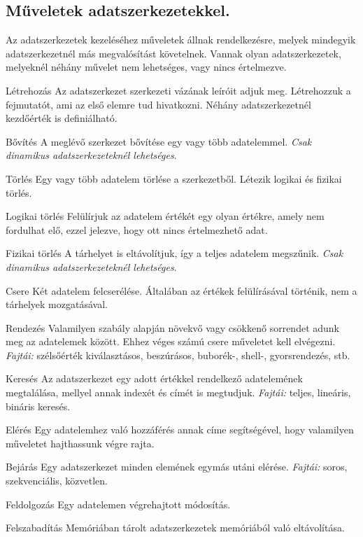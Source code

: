 \subsection{Műveletek adatszerkezetekkel.}
Az adatszerkezetek kezeléséhez műveletek állnak rendelkezésre, melyek mindegyik adatszerkezetnél más megvalósítást követelnek. Vannak olyan adatszerkezetek, melyeknél néhány művelet nem lehetséges, vagy nincs értelmezve.
\begin{enumdescript}
	\item[Létrehozás] Az adatszerkezet szerkezeti vázának leíróit adjuk meg. Létrehozzuk a fejmutatót, ami az első elemre tud hivatkozni. Néhány adatszerkezetnél kezdőérték is definiálható.
	\item[Bővítés] A meglévő szerkezet bővítése egy vagy több adatelemmel. \emph{Csak dinamikus adatszerkezeteknél lehetséges}.
	\item[Törlés] Egy vagy több adatelem törlése a szerkezetből. Létezik logikai és fizikai törlés.
	\begin{enumdescript}[noitemsep]
		\item[Logikai törlés] Felülírjuk az adatelem értékét egy olyan értékre, amely nem fordulhat elő, ezzel jelezve, hogy ott nincs értelmezhető adat.
		\item[Fizikai törlés] A tárhelyet is eltávolítjuk, így a teljes adatelem megszűnik. \emph{Csak dinamikus adatszerkezeteknél lehetséges}.
	\end{enumdescript}
	\item[Csere]  Két adatelem felcserélése. Általában az értékek felülírásával történik, nem a tárhelyek mozgatásával.
	\item[Rendezés] Valamilyen szabály alapján növekvő vagy csökkenő sorrendet adunk meg az adatelemek között. Ehhez véges számú csere műveletet kell elvégezni. \emph{Fajtái:} szélsőérték kiválasztásos, beszúrásos, buborék-, shell-, gyorsrendezés, stb.
	\item[Keresés] Az adatszerkezet egy adott értékkel rendelkező adatelemének megtalálása, mellyel annak indexét és címét is megtudjuk. \emph{Fajtái:} teljes, lineáris, bináris keresés.
	\item[Elérés] Egy adatelemhez való hozzáférés annak címe segítségével, hogy valamilyen műveletet hajthassunk végre rajta.
	\item[Bejárás] Egy adatszerkezet minden elemének egymás utáni elérése. \emph{Fajtái:} soros, szekvenciális, közvetlen.
	\item[Feldolgozás] Egy adatelemen végrehajtott módosítás.
	\item[Felszabadítás] Memóriában tárolt adatszerkezetek memóriából való eltávolítása.
\end{enumdescript}

